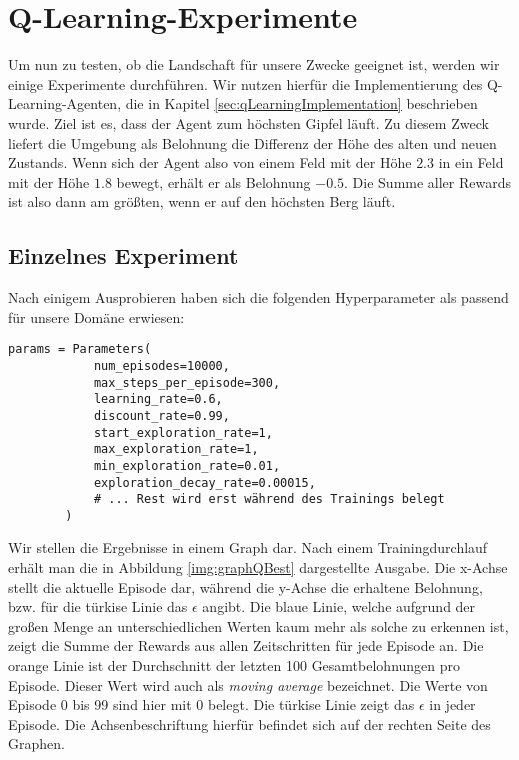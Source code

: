 \section{Q-Learning-Experimente} \label{sec:qLearningExperiments}

Um nun zu testen, ob die Landschaft für unsere Zwecke geeignet ist, werden wir einige Experimente durchführen. Wir nutzen hierfür die Implementierung des Q-Learning-Agenten, die in Kapitel \ref{sec:qLearningImplementation} beschrieben wurde. Ziel ist es, dass der Agent zum höchsten Gipfel läuft. Zu diesem Zweck liefert die Umgebung als Belohnung die Differenz der Höhe des alten und neuen Zustands. Wenn sich der Agent also von einem Feld mit der Höhe $ 2.3 $ in ein Feld mit der Höhe $ 1.8 $ bewegt, erhält er als Belohnung $ -0.5 $. Die Summe aller Rewards ist also dann am größten, wenn er auf den höchsten Berg läuft.

\subsection{Einzelnes Experiment}
Nach einigem Ausprobieren haben sich die folgenden Hyperparameter als passend für unsere Domäne erwiesen:
\begin{verbatim}
params = Parameters(
            num_episodes=10000,
            max_steps_per_episode=300,
            learning_rate=0.6,
            discount_rate=0.99,
            start_exploration_rate=1,
            max_exploration_rate=1,
            min_exploration_rate=0.01,
            exploration_decay_rate=0.00015,
            # ... Rest wird erst während des Trainings belegt
        )
\end{verbatim}

Wir stellen die Ergebnisse in einem Graph dar. Nach einem Trainingdurchlauf erhält man die in Abbildung \ref{img:graphQBest} dargestellte Ausgabe. Die x-Achse stellt die aktuelle Episode dar, während die y-Achse die erhaltene Belohnung, bzw. für die türkise Linie das $ \epsilon $ angibt. Die blaue Linie, welche aufgrund der großen Menge an unterschiedlichen Werten kaum mehr als solche zu erkennen ist, zeigt die Summe der Rewards aus allen Zeitschritten für jede Episode an. Die orange Linie ist der Durchschnitt der letzten 100 Gesamtbelohnungen pro Episode. Dieser Wert wird auch als \textit{moving average} bezeichnet. Die Werte von Episode 0 bis 99 sind hier mit 0 belegt. Die türkise Linie zeigt das $ \epsilon $ in jeder Episode. Die Achsenbeschriftung hierfür befindet sich auf der rechten Seite des Graphen.


